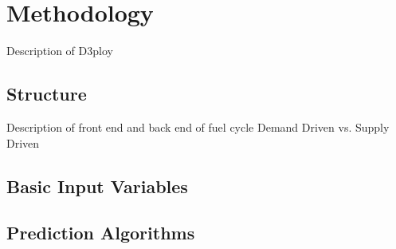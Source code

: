 \section{Methodology}
Description of D3ploy
\subsection{Structure}
Description of front end and back end of fuel cycle 
Demand Driven vs. Supply Driven 
\subsection{Basic Input Variables}
\subsection{Prediction Algorithms}
\subsection{}